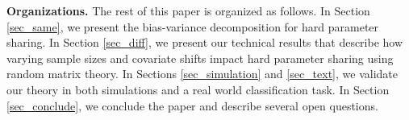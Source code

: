 




\textbf{Organizations.}
The rest of this paper is organized as follows.
In Section \ref{sec_same}, we present the bias-variance decomposition for hard parameter sharing.
In Section \ref{sec_diff}, we present our technical results that describe how varying sample sizes and covariate shifts impact hard parameter sharing using random matrix theory.
In Sections \ref{sec_simulation} and \ref{sec_text}, we validate our theory in both simulations and a real world classification task.
In Section \ref{sec_conclude}, we conclude the paper and describe several open questions.

